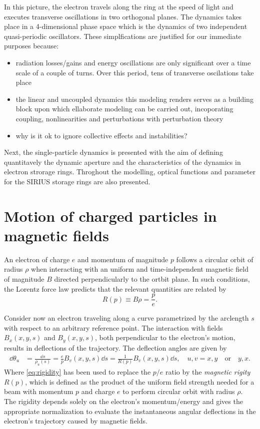 In this picture, the electron travels along the ring at the speed of light and executes transverse oscillations in two orthogonal planes. The dynamics takes place in a 4-dimensional phase space which is the  dynamics of two independent quasi-periodic oscillators. These simplfications are justified for our immediate purposes because:
\begin{itemize}
    \item radiation losses/gains and energy oscillations are only significant over a time scale of a couple of turns. Over this period, tens of transverse oscilations take place
    \item the linear and uncoupled dynamics this modeling renders serves as a building block upon which ellaborate modeling can be carried out, incoporating coupling, nonlinearities and perturbations with perturbation theory
    \item why is it ok to ignore collective effects and instabilities?
\end{itemize}

Next, the single-particle dynamics is presented with the aim of defining quantitavely the dynamic aperture and the characteristics of the dynamics in electron strorage rings. Throghout the modelling, optical functions and parameter for the SIRIUS storage rings are also presented.
\section{Motion of charged particles in magnetic fields}
An electron of charge $e$ and momentum of magnitude $p$ follows a circular orbit of radius $\rho$ when interacting with an uniform and time-independent magnetic field of magnitude $B$ directed perpendicularly to the ortbit plane. In such conditions, the Lorentz force law predicts that the relevant quantities are related by
\begin{equation}
    R(p)\equiv B\rho = \frac{p}{e}.
    \label{eq:rigidity}
\end{equation}

Consider now an electron traveling along a curve parametrized by the arclength $s$ with respect to an arbitrary reference point. The interaction with fields $B_x(x,y,s)$  and $B_y(x,y,s)$, both perpendicular to the electron's motion, results in deflections of the trajectory. The deflection angles are given by
    \begin{equation}
        \begin{aligned}
            \dd{\theta_u} & = \frac{\dd{s}}{\rho_u(s)} = \frac{e}{p}B_v(x,y,s)\dd s = \frac{1}{R(p)}B_v(x,y,s)\dd s, \quad u,v=x, y \quad\text{or}\quad y,x.
        \end{aligned}
        \label{eq:deflec_angles}
    \end{equation}
Where \eqref{eq:rigidity} has been used to replace the $p/e$ ratio by the \textit{magnetic rigity} $R(p)$, which is defined as the product of the uniform field strength needed for a beam with momentum $p$ and charge $e$ to perform circular orbit with radius $\rho$. The rigidity depends solely on the electron's momentum/energy and gives the appropriate normalization to evaluate the instantaneous angular deflections in the electron's trajectory caused by magnetic fields.

